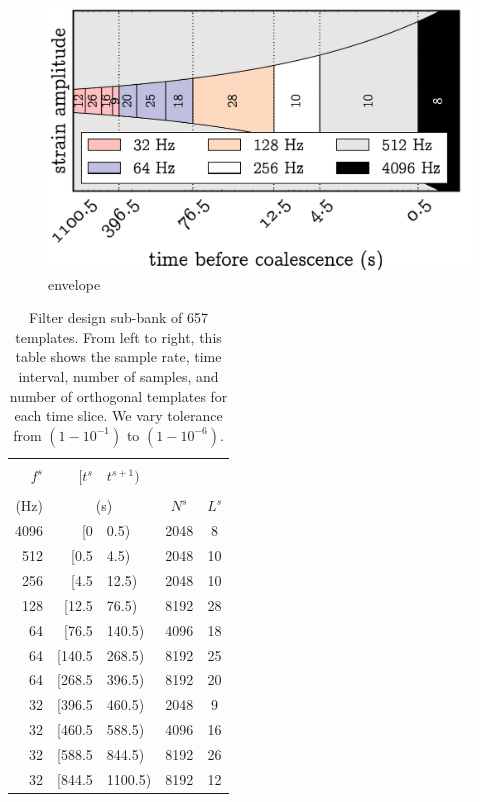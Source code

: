 \documentclass[portrait,plainboxedsections]{sciposter}
\begin{document}
\begin{multicols}{3}
\begin{figure}
\includegraphics{figures/envelope}
\caption{envelope}
\end{figure}

\begin{table}
\begin{tabular}{rr@{,\,}lcc}
\toprule
\\ [-2ex]
$f^s$ & $[t^s$&$t^{s+1})$ & & \\%
\\[-2.5ex]
(Hz) & \multicolumn{2}{c}{(s)} & $N^s$ & $L^s$ \\ \midrule
4096 & [0&0.5) & 2048 & 8 \\
512 & [0.5&4.5) & 2048 & 10 \\
256 & [4.5&12.5) & 2048 & 10 \\
128 & [12.5&76.5) & 8192 & 28 \\
64 & [76.5&140.5) & 4096 & 18 \\
64 & [140.5&268.5) & 8192 & 25 \\
64 & [268.5&396.5) & 8192 & 20 \\
32 & [396.5&460.5) & 2048 & 9 \\
32 & [460.5&588.5) & 4096 & 16 \\
32 & [588.5&844.5) & 8192 & 26 \\
32 & [844.5&1100.5) & 8192 & 12 \\
\bottomrule
\end{tabular}
\caption{\label{tab:time_slices} Filter design sub-bank of 657 templates.  From left to right, this table shows the sample rate, time interval, number of samples, and number of orthogonal templates for each time slice.  We vary \SVD{} tolerance from $\left(1-10^{-1}\right)$ to $\left(1-10^{-6}\right)$.}
\end{table}



\end{multicols}
\end{document}
